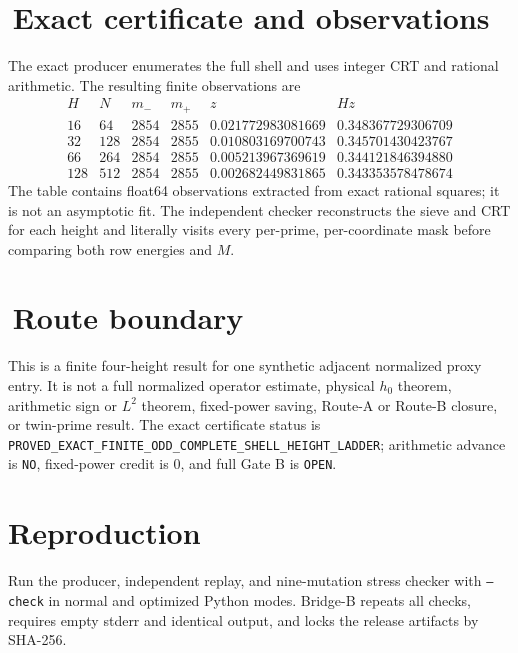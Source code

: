 \documentclass[11pt]{article}
\begin{document}
\section{\,Exact certificate and observations}
The exact producer enumerates the full shell and uses integer CRT and
rational arithmetic.  The resulting finite observations are
\[
\begin{array}{c|r|r|r|c|c}
H&N&m_-&m_+&z&Hz\\ \hline
16&64&2854&2855&0.021772983081669&0.348367729306709\\
32&128&2854&2855&0.010803169700743&0.345701430423767\\
66&264&2854&2855&0.005213967369619&0.344121846394880\\
128&512&2854&2855&0.002682449831865&0.343353578478674
\end{array}
\]
The table contains float64 observations extracted from exact rational
squares; it is not an asymptotic fit.  The independent checker reconstructs
the sieve and CRT for each height and literally visits every per-prime,
per-coordinate mask before comparing both row energies and $M$.

\section{\,Route boundary}
This is a finite four-height result for one synthetic adjacent normalized
proxy entry.  It is not a full normalized operator estimate, physical
$h_0$ theorem, arithmetic sign or $L^2$ theorem, fixed-power saving,
Route-A or Route-B closure, or twin-prime result.  The exact certificate
status is \texttt{PROVED\_EXACT\_FINITE\_ODD\_COMPLETE\_SHELL\_HEIGHT\_LADDER};
arithmetic advance is \texttt{NO}, fixed-power credit is $0$, and full Gate B
is \texttt{OPEN}.

\section*{Reproduction}
Run the producer, independent replay, and nine-mutation stress checker with
\texttt{--check} in normal and optimized Python modes.  Bridge-B repeats all
checks, requires empty stderr and identical output, and locks the release
artifacts by SHA-256.
\end{document}
